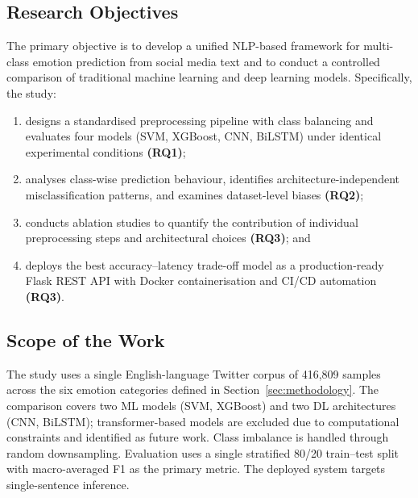 \subsection{Research Objectives}

The primary objective is to develop a unified NLP-based framework for multi-class emotion prediction from social media text and to conduct a controlled comparison of traditional machine learning and deep learning models. Specifically, the study:
\begin{enumerate}[nosep]
    \item designs a standardised preprocessing pipeline with class balancing and evaluates four models (SVM, XGBoost, CNN, BiLSTM) under identical experimental conditions \textbf{(RQ1)};
    \item analyses class-wise prediction behaviour, identifies architecture-independent misclassification patterns, and examines dataset-level biases \textbf{(RQ2)};
    \item conducts ablation studies to quantify the contribution of individual preprocessing steps and architectural choices \textbf{(RQ3)}; and
    \item deploys the best accuracy--latency trade-off model as a production-ready Flask REST API with Docker containerisation and CI/CD automation \textbf{(RQ3)}.
\end{enumerate}

\subsection{Scope of the Work}

The study uses a single English-language Twitter corpus of 416,809 samples across the six emotion categories defined in Section~\ref{sec:methodology}. The comparison covers two ML models (SVM, XGBoost) and two DL architectures (CNN, BiLSTM); transformer-based models are excluded due to computational constraints and identified as future work. Class imbalance is handled through random downsampling. Evaluation uses a single stratified 80/20 train--test split with macro-averaged F1 as the primary metric. The deployed system targets single-sentence inference.
